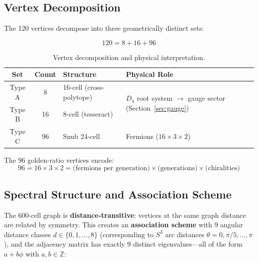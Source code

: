 \documentclass[12pt,a4paper]{article}
\begin{document}
\subsection{Vertex Decomposition}

The 120 vertices decompose into three geometrically distinct sets:

\begin{equation}
120 = 8 + 16 + 96
\end{equation}

\begin{table}[H]
\centering
\begin{tabular}{ccll}
\toprule
\textbf{Set} & \textbf{Count} & \textbf{Structure} & \textbf{Physical Role} \\
\midrule
Type A & 8 & 16-cell (cross-polytope) & \multirow{2}{*}{$D_4$ root system $\to$ gauge sector (Section~\ref{sec:gauge})} \\
Type B & 16 & 8-cell (tesseract) & \\
Type C & 96 & Snub 24-cell & Fermions ($16 \times 3 \times 2$) \\
\bottomrule
\end{tabular}
\caption{Vertex decomposition and physical interpretation.}
\end{table}

The 96 golden-ratio vertices encode:
\begin{equation}
96 = 16 \times 3 \times 2 = \text{(fermions per generation)} \times \text{(generations)} \times \text{(chiralities)}
\end{equation}

\subsection{Spectral Structure and Association Scheme}
\label{sec:spectral}

The 600-cell graph is \textbf{distance-transitive}: vertices at the same graph distance are related by symmetry. This creates an \textbf{association scheme} with 9 angular distance classes $d \in \{0, 1, \ldots, 8\}$ (corresponding to $S^3$ arc distances $\theta = 0, \pi/5, \ldots, \pi$), and the adjacency matrix has exactly 9 distinct eigenvalues---all of the form $a + b\phi$ with $a,b \in \mathbb{Z}$:
\end{document}
